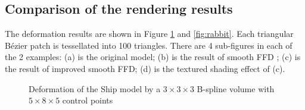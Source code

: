 \documentclass[3p]{elsarticle}
\begin{document}
\subsection{Comparison of the rendering results}
\label{sec:comparison_of_rendering}

The deformation results are shown in Figure \ref{fig:ship} and \ref{fig:rabbit}. Each triangular B\'ezier patch is
tessellated into 100 triangles. There are 4 sub-figures in each of the 2 examples: (a) is the original model; (b) is the
result of smooth FFD \cite{Cui13, Cui14}; (c) is the result of improved smooth FFD; (d) is the textured shading effect of (c).

\begin{figure}[htbp]
\begin{center}
	\begin{minipage}[l]{0.54\textwidth}
		\centering
		\caption{Deformation of the Ship model by a $3\times3\times3$ B-spline volume with $5\times8\times5$ control points}
		\label{fig:ship}
	\end{minipage}
\end{center}
\end{figure}
\end{document}
